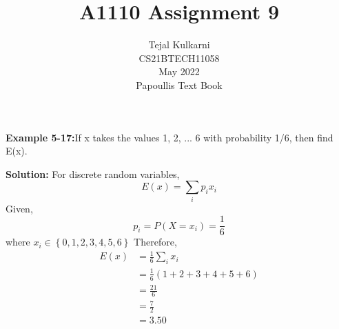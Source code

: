\documentclass[journal,12pt,two column]{IEEEtran}
\title{A1110 Assignment 9 }
\author{Tejal Kulkarni \\ CS21BTECH11058 \\\vspace*{20pt} May 2022 \\  Papoullis Text Book }
\begin{document}
\maketitle

\newcommand{\solution}{\noindent \textbf{Solution: }}
\providecommand{\pr}[1]{\ensuremath{\Pr\left(#1\right)}}
\providecommand{\cdf}[2]{\ensuremath{\text{F}_{#1}\left(#2\right)}}
\providecommand{\qfunc}[1]{\ensuremath{Q\left(#1\right)}}
\providecommand{\sbrak}[1]{\ensuremath{{}\left[#1\right]}}
\providecommand{\lsbrak}[1]{\ensuremath{{}\left[#1\right.}}
\providecommand{\rsbrak}[1]{\ensuremath{{}\left.#1\right]}}
\providecommand{\brak}[1]{\ensuremath{\left(#1\right)}}
\providecommand{\lbrak}[1]{\ensuremath{\left(#1\right.}}
\providecommand{\rbrak}[1]{\ensuremath{\left.#1\right)}}
\providecommand{\cbrak}[1]{\ensuremath{\left\{#1\right\}}}
\providecommand{\lcbrak}[1]{\ensuremath{\left\{#1\right.}}
\providecommand{\rcbrak}[1]{\ensuremath{\left.#1\right\}}}
\newcommand*{\permcomb}[4][0mu]{{{}^{#3}\mkern#1#2_{#4}}}
\newcommand*{\perm}[1][-3mu]{\permcomb[#1]{P}}
\newcommand*{\comb}[1][-1mu]{\permcomb[#1]{C}}
\renewcommand{\thetable}{\arabic{table}}

\textbf{Example 5-17:}If x takes the values 1, 2, ... 6 with probability 1/6, then find E(x).

\solution
For discrete random variables, 
\begin{equation}
    E(x) = \sum_{i} p_ix_i   
\end{equation}
Given,
\begin{equation}
    p_i = P(X = x_i) = \frac{1}{6}
\end{equation}
where $x_i\in \cbrak{0,1,2,3,4,5,6}$
Therefore,
\begin{align}
    E(x) &= \frac{1}{6}\sum_{i} x_i \\
         &= \frac{1}{6}\brak{1+2+3+4+5+6} \\
         &= \frac{21}{6} \\
         &= \frac{7}{2} \\
         &= \boxed{3.50}
\end{align}
\end{document}
